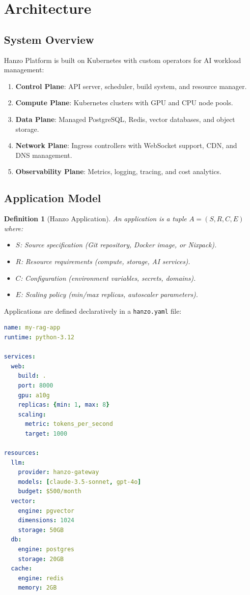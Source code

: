 \documentclass[11pt,twocolumn]{article}
\newtheorem{definition}{Definition}
\begin{document}
\section{Architecture}
\label{sec:architecture}

\subsection{System Overview}

Hanzo Platform is built on Kubernetes with custom operators for AI workload management:

\begin{enumerate}[leftmargin=1.4em]
    \item \textbf{Control Plane}: API server, scheduler, build system, and resource manager.
    \item \textbf{Compute Plane}: Kubernetes clusters with GPU and CPU node pools.
    \item \textbf{Data Plane}: Managed PostgreSQL, Redis, vector databases, and object storage.
    \item \textbf{Network Plane}: Ingress controllers with WebSocket support, CDN, and DNS management.
    \item \textbf{Observability Plane}: Metrics, logging, tracing, and cost analytics.
\end{enumerate}

\subsection{Application Model}

\begin{definition}[Hanzo Application]
An application is a tuple $A = (S, R, C, E)$ where:
\begin{itemize}[leftmargin=1.1em]
    \item $S$: Source specification (Git repository, Docker image, or Nixpack).
    \item $R$: Resource requirements (compute, storage, AI services).
    \item $C$: Configuration (environment variables, secrets, domains).
    \item $E$: Scaling policy (min/max replicas, autoscaler parameters).
\end{itemize}
\end{definition}

Applications are defined declaratively in a \texttt{hanzo.yaml} file:

\begin{lstlisting}[language=yaml,caption={Example hanzo.yaml for an AI application.}]
name: my-rag-app
runtime: python-3.12

services:
  web:
    build: .
    port: 8000
    gpu: a10g
    replicas: {min: 1, max: 8}
    scaling:
      metric: tokens_per_second
      target: 1000

resources:
  llm:
    provider: hanzo-gateway
    models: [claude-3.5-sonnet, gpt-4o]
    budget: $500/month
  vector:
    engine: pgvector
    dimensions: 1024
    storage: 50GB
  db:
    engine: postgres
    storage: 20GB
  cache:
    engine: redis
    memory: 2GB
\end{lstlisting}
\end{document}
